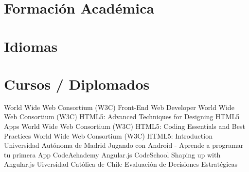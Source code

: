 \documentclass[]{cvStyle1}
\begin{document}
    \section*{Formaci\'on Acad\'emica}
    
    \section*{Idiomas}
        
    
    \pagebreak
    
    
        
        
        
        
        
        
        
        
    \section*{Cursos / Diplomados}
        \skill
            {World Wide Web Consortium (W3C)}
            {Front-End Web Developer}
        \skill
            {World Wide Web Consortium (W3C)}
            {HTML5: Advanced Techniques for Designing HTML5 Apps}
        \skill
            {World Wide Web Consortium (W3C)}
            {HTML5: Coding Essentials and Best Practices}
        \skill
            {World Wide Web Consortium (W3C)}
            {HTML5: Introduction}
        \skill
            {Universidad Aut\'onoma de Madrid}
            {Jugando con Android - Aprende a programar tu primera App}
        \skill
            {CodeAchademy}
            {Angular.js}
        \skill
            {CodeSchool}
            {Shaping up with Angular.js}
        \skill
            {Uiversidad Cat\'olica de Chile}
            {Evaluaci\'on de Decisiones Estrat\'egicas}
\end{document}
